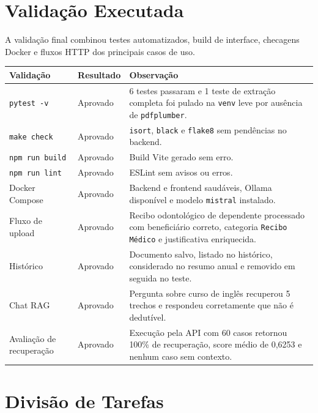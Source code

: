 \documentclass[11pt,a4paper,oneside]{article}
\begin{document}
\section{Validação Executada}

A validação final combinou testes automatizados, build de interface, checagens Docker e fluxos HTTP dos principais casos de uso.

\begin{center}
\begin{tabularx}{\textwidth}{@{}L{54mm}L{32mm}Y@{}}
\toprule
\textbf{Validação} & \textbf{Resultado} & \textbf{Observação} \\
\midrule
\texttt{pytest -v} & Aprovado & 6 testes passaram e 1 teste de extração completa foi pulado na \texttt{venv} leve por ausência de \texttt{pdfplumber}. \\
\texttt{make check} & Aprovado & \texttt{isort}, \texttt{black} e \texttt{flake8} sem pendências no backend. \\
\texttt{npm run build} & Aprovado & Build Vite gerado sem erro. \\
\texttt{npm run lint} & Aprovado & ESLint sem avisos ou erros. \\
Docker Compose & Aprovado & Backend e frontend saudáveis, Ollama disponível e modelo \texttt{mistral} instalado. \\
Fluxo de upload & Aprovado & Recibo odontológico de dependente processado com beneficiário correto, categoria \texttt{Recibo Médico} e justificativa enriquecida. \\
Histórico & Aprovado & Documento salvo, listado no histórico, considerado no resumo anual e removido em seguida no teste. \\
Chat RAG & Aprovado & Pergunta sobre curso de inglês recuperou 5 trechos e respondeu corretamente que não é dedutível. \\
Avaliação de recuperação & Aprovado & Execução pela API com 60 casos retornou 100\% de recuperação, score médio de 0,6253 e nenhum caso sem contexto. \\
\bottomrule
\end{tabularx}
\end{center}

\section{Divisão de Tarefas}
\end{document}
